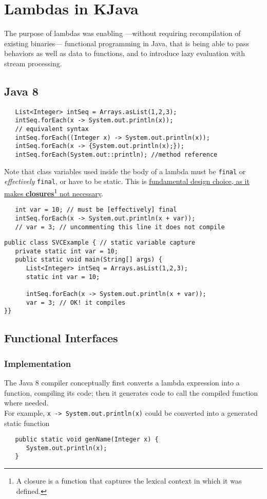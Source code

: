 \chapter{Lambdas in KJava}
The purpose of lambdas was enabling ---without requiring recompilation of existing binaries--- functional programming in Java, that is being able to pass behaviors as well as data to functions, and to introduce lazy evaluation with stream processing.
\section{Java 8}
\lstset{style=javaBlock}
\begin{lstlisting}
   List<Integer> intSeq = Arrays.asList(1,2,3);
   intSeq.forEach(x -> System.out.println(x));
   // equivalent syntax
   intSeq.forEach((Integer x) -> System.out.println(x));
   intSeq.forEach(x -> {System.out.println(x);});
   intSeq.forEach(System.out::println); //method reference
\end{lstlisting}

Note that class variables used inside the body of a lambda must be \lstinline|final| or \textit{effectively} \lstinline|final|, or have to be static.
This is \ul{fundamental design choice, as it makes \textbf{closures}\footnote{A closure is a function that captures the lexical context in which it was defined.} not necessary}.
\begin{lstlisting}
   int var = 10; // must be [effectively] final
   intSeq.forEach(x -> System.out.println(x + var));
   // var = 3; // uncommenting this line it does not compile
\end{lstlisting}
\begin{lstlisting}
public class SVCExample { // static variable capture
   private static int var = 10;
   public static void main(String[] args) {
      List<Integer> intSeq = Arrays.asList(1,2,3);
      static int var = 10;
   
      intSeq.forEach(x -> System.out.println(x + var));
      var = 3; // OK! it compiles
}}
   \end{lstlisting}

\section{Functional Interfaces}
\subsection{Implementation}
The Java 8 compiler conceptually first converts a lambda
expression into a function, compiling its code; 
then it generates code to call the compiled function where
needed.\\
For example, \lstinline|x -> System.out.println(x)| could be
converted into a generated static function
\begin{lstlisting}
   public static void genName(Integer x) {
      System.out.println(x);
   }
\end{lstlisting}


